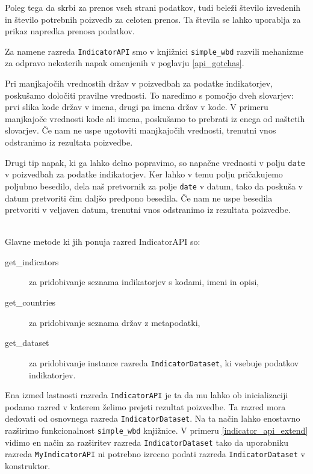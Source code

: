 Poleg tega da skrbi za prenos vseh strani podatkov, tudi beleži število 
izvedenih in število potrebnih poizvedb za celoten prenos. Ta števila se
lahko uporablja za prikaz napredka prenosa podatkov.


Za namene razreda \verb|IndicatorAPI| smo v knjižnici \verb|simple_wbd|
razvili mehanizme za odpravo nekaterih napak omenjenih v poglavju 
\ref{api_gotchas}.

Pri manjkajočih vrednostih držav v poizvedbah za podatke indikatorjev,
poskušamo določiti pravilne vrednosti. To naredimo s pomočjo dveh
slovarjev: prvi slika kode držav v imena, drugi pa imena držav v kode. V
primeru manjkajoče vrednosti kode ali imena, poskušamo to prebrati iz enega
od naštetih slovarjev. Če nam ne uspe ugotoviti manjkajočih vrednosti,
trenutni vnos odstranimo iz rezultata poizvedbe.

Drugi tip napak, ki ga lahko delno popravimo, so napačne vrednosti v polju
\verb|date| v poizvedbah za podatke indikatorjev. Ker lahko v temu polju
pričakujemo poljubno besedilo, dela naš pretvornik za polje \verb|date| v 
datum, tako da poskuša v datum pretvoriti čim daljšo predpono besedila.
Če nam ne uspe besedila pretvoriti v veljaven datum, trenutni vnos odstranimo
iz rezultata poizvedbe.


\ \\
Glavne metode ki jih ponuja razred IndicatorAPI so:

\begin{description}  
\item [get\_indicators] za pridobivanje seznama indikatorjev s kodami, imeni
      in opisi,
\item [get\_countries] za pridobivanje seznama držav z metapodatki,
\item [get\_dataset] za pridobivanje instance razreda \verb|IndicatorDataset|,
      ki vsebuje podatkov indikatorjev.
\end{description}

Ena izmed lastnosti razreda \verb|IndicatorAPI| je ta da mu lahko ob
inicializaciji podamo razred v katerem želimo prejeti rezultat poizvedbe. Ta
razred mora dedovati od osnovnega razreda \verb|IndicatorDataset|. Na ta
način lahko enostavno razširimo funkcionalnost \verb|simple_wbd| knjižnice.
V primeru \ref{indicator_api_extend} vidimo en način za razširitev razreda 
\verb|IndicatorDataset| tako da uporabniku razreda \verb|MyIndicatorAPI| ni
potrebno izrecno podati razreda \verb|IndicatorDataset| v konstruktor.

